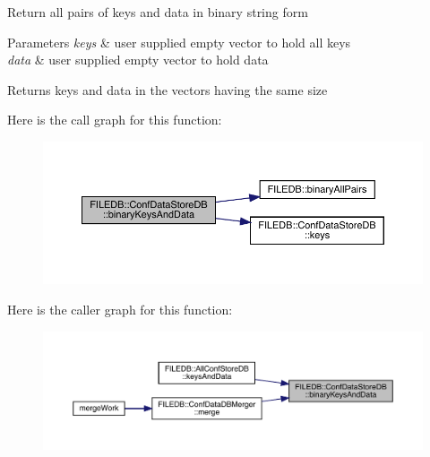 Return all pairs of keys and data in binary string form 
\begin{DoxyParams}{Parameters}
{\em keys} & user supplied empty vector to hold all keys \\
\hline
{\em data} & user supplied empty vector to hold data \\
\hline
\end{DoxyParams}
\begin{DoxyReturn}{Returns}
keys and data in the vectors having the same size 
\end{DoxyReturn}
Here is the call graph for this function\+:
\nopagebreak
\begin{figure}[H]
\begin{center}
\leavevmode
\includegraphics[width=350pt]{d8/d19/classFILEDB_1_1ConfDataStoreDB_ae38beaf9ba3f8629f2c322a3c5a23357_cgraph}
\end{center}
\end{figure}
Here is the caller graph for this function\+:\nopagebreak
\begin{figure}[H]
\begin{center}
\leavevmode
\includegraphics[width=350pt]{d8/d19/classFILEDB_1_1ConfDataStoreDB_ae38beaf9ba3f8629f2c322a3c5a23357_icgraph}
\end{center}
\end{figure}
\mbox{\label{classFILEDB_1_1ConfDataStoreDB_ae38beaf9ba3f8629f2c322a3c5a23357}} 
